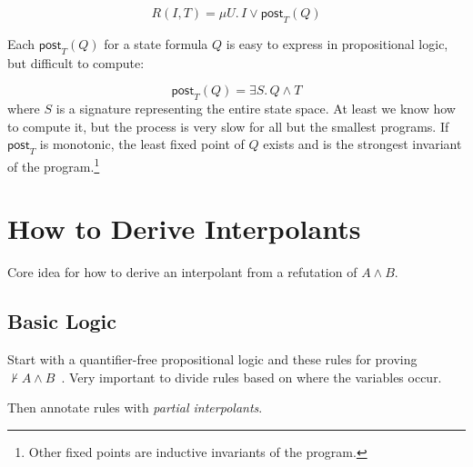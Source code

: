 \documentclass{article}
\begin{document}
 $$R(I, T) = \mu U.\, I \vee \mathsf{post}_T(Q)$$

Each $\mathsf{post}_T(Q)$ for a state formula $Q$ is easy to express in
 propositional logic, but difficult to compute:

  $$\mathsf{post}_T(Q) = \exists S .\, Q \wedge T$$
 where $S$ is a signature representing the entire state space.
At least we know how to compute it, but the process is very slow for all
 but the smallest programs.
If $\mathsf{post}_T$ is monotonic, the least fixed point of $Q$ exists
 and is the strongest invariant of the program.\footnote{Other fixed points
  are inductive invariants of the program.}


\section{How to Derive Interpolants}

Core idea for how to derive an interpolant from a refutation of $A \wedge B$.

\subsection{Basic Logic}

Start with a quantifier-free propositional logic and these rules
 for proving $\not\vdash A \wedge B$~\cite{d-nyu-2015}.
Very important to divide rules based on where the variables occur.

\begin{mathpar}



\end{mathpar}

Then annotate rules with \emph{partial interpolants}.
\end{document}
